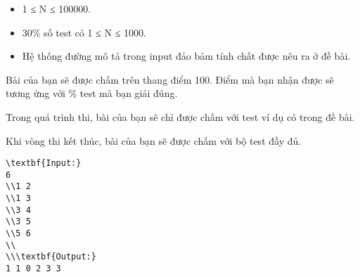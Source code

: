 \begin{itemize}
	\item     1 ≤ N ≤ 100000.   
	\item     30\% số test có 1 ≤ N ≤ 1000.   
	\item     Hệ thống đường mô tả trong input đảo bảm tính chất được nêu ra ở đề bài.   
\end{itemize}
Bài của bạn sẽ được chấm trên thang điểm 100. Điểm mà bạn nhận được sẽ tương ứng với \% test mà bạn giải đúng.  

   Trong quá trình thi, bài của bạn sẽ chỉ được chấm với test ví dụ có trong đề bài.  

   Khi vòng thi kết thúc, bài của bạn sẽ được chấm với bộ test đầy đủ.
\begin{verbatim}
\textbf{Input:}
6
\\1 2
\\1 3
\\3 4
\\3 5
\\5 6
\\
\\\textbf{Output:}
1 1 0 2 3 3
\end{verbatim}